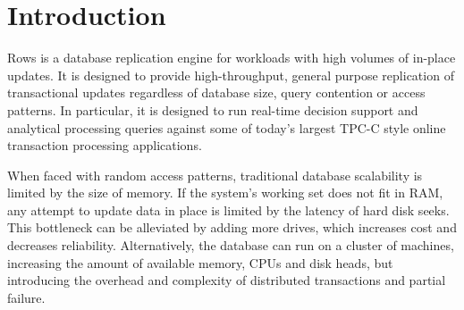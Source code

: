 \documentclass{sig-alternate-sigmod08}
\newcommand{\rows}{Rows\xspace}
\newcommand{\rowss}{Rows'\xspace}
\begin{document}
\begin{abstract}
\rowss throughput is limited by sequential I/O bandwidth.  We use
column compression to reduce this bottleneck.  Rather than reassemble
rows from a column-oriented disk layout, we adapt existing column
compression algorithms to a novel row-oriented data layout.  This
approach to database compression introduces negligible space overhead
and can be applied to most single-pass, randomly accessible
compression formats.  Our prototype uses lightweight (superscalar)
column compression algorithms.

Existing analytical models and our experiments reveal that, for disk and
CPU-bound workloads, \rows provides orders of magnitude greater
throughput than conventional replication techniques.

\end{abstract}





\section{Introduction}

\rows is a database replication engine for workloads with high volumes
of in-place updates.  It is designed to provide high-throughput,
general purpose replication of transactional updates regardless of
database size, query contention or access patterns.  In particular, it
is designed to run real-time decision support and analytical
processing queries against some of today's largest TPC-C style online
transaction processing applications.

When faced with random access patterns, traditional database
scalability is limited by the size of memory.  If the system's working
set does not fit in RAM, any attempt to update data in place is
limited by the latency of hard disk seeks.  This bottleneck can be
alleviated by adding more drives, which increases cost and decreases
reliability.  Alternatively, the database can run on a cluster of
machines, increasing the amount of available memory, CPUs and disk
heads, but introducing the overhead and complexity of distributed
transactions and partial failure.
\end{document}
